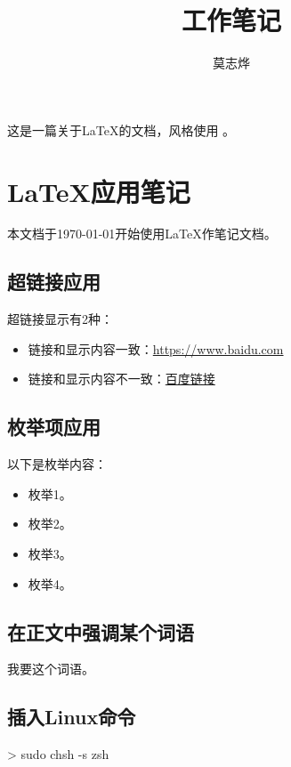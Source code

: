 \documentclass{hitec}
\title{工作笔记}
\author{莫志烨}
\newcommand{\HT}{\textsc{\raisebox{0.1em}{H}\raisebox{-0.1em}{I}%
	\raisebox{0.1em}{T}\raisebox{-0.1em}{E}\raisebox{0.1em}{C} }}
\begin{document}
\begin{titlepage}
\maketitle
这是一篇关于\LaTeX 的文档，风格使用 \HT 。
\end{titlepage}

%
\tableofcontents
\newpage
\newpage

\section{\LaTeX 应用笔记}
本文档于\today 开始使用\LaTeX 作笔记文档。

\subsection{超链接应用}
超链接显示有2种：
\begin{itemize}
\item 链接和显示内容一致：\url{https://www.baidu.com}
\item 链接和显示内容不一致：\href{https://www.baidu.com}{百度链接}
\end{itemize}

\subsection{枚举项应用}
以下是枚举内容：
\begin{itemize}
\item 枚举1。
\item 枚举2。
\item 枚举3。
\item 枚举4。
\end{itemize}


\subsection{在正文中强调某个词语}
我要这个词语。

\subsection{插入Linux命令}
\begin{cmd}
 > sudo chsh -s zsh
\end{cmd}
\end{document}
